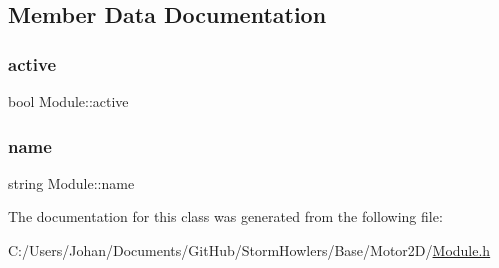 \subsection{Member Data Documentation}
\mbox{\label{class_module_a59cb26d32bc36a6c3415572fb46d9be5}} 
\subsubsection{\texorpdfstring{active}{active}}
{\footnotesize\ttfamily bool Module\+::active}

\mbox{\label{class_module_a06c326572272c938b3f2a01ee75e56c9}} 
\subsubsection{\texorpdfstring{name}{name}}
{\footnotesize\ttfamily string Module\+::name}



The documentation for this class was generated from the following file\+:\begin{DoxyCompactItemize}
\item 
C\+:/\+Users/\+Johan/\+Documents/\+Git\+Hub/\+Storm\+Howlers/\+Base/\+Motor2\+D/\mbox{\hyperlink{_module_8h}{Module.\+h}}\end{DoxyCompactItemize}
